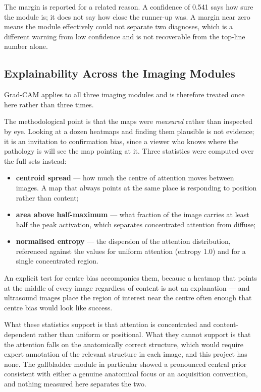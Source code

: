 The margin is reported for a related reason. A confidence of 0.541 says how sure the module is;
it does not say how close the runner-up was. A margin near zero means the module effectively
could not separate two diagnoses, which is a different warning from low confidence and is not
recoverable from the top-line number alone.

\subsection{Explainability Across the Imaging Modules}
\label{subsec:explainability}

Grad-CAM applies to all three imaging modules and is therefore treated once here rather than
three times.

The methodological point is that the maps were \emph{measured} rather than inspected by eye.
Looking at a dozen heatmaps and finding them plausible is not evidence; it is an invitation to
confirmation bias, since a viewer who knows where the pathology is will see the map pointing at
it. Three statistics were computed over the full sets instead:

\begin{itemize}
  \item \textbf{centroid spread} --- how much the centre of attention moves between images. A
        map that always points at the same place is responding to position rather than content;
  \item \textbf{area above half-maximum} --- what fraction of the image carries at least half
        the peak activation, which separates concentrated attention from diffuse;
  \item \textbf{normalised entropy} --- the dispersion of the attention distribution, referenced
        against the values for uniform attention (entropy 1.0) and for a single concentrated
        region.
\end{itemize}

An explicit test for centre bias accompanies them, because a heatmap that points at the middle
of every image regardless of content is not an explanation --- and ultrasound images place the
region of interest near the centre often enough that centre bias would look like success.

What these statistics support is that attention is concentrated and content-dependent rather
than uniform or positional. What they cannot support is that the attention falls on the
anatomically correct structure, which would require expert annotation of the relevant structure
in each image, and this project has none. The gallbladder module in particular showed a
pronounced central prior consistent with either a genuine anatomical focus or an acquisition
convention, and nothing measured here separates the two.

